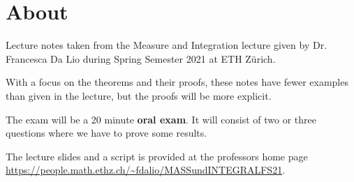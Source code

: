 \section*{About}

Lecture notes taken from the Measure and Integration lecture given by Dr. Francesca Da Lio during Spring Semester 2021 at ETH Zürich.

With a focus on the theorems and their proofs,
these notes have fewer examples than given in the lecture, but the proofs will be more explicit.

The exam will be a 20 minute \textbf{oral exam}. It will consist of two or three questions where we have to prove some results.

The lecture slides and a script is provided at the professors home page \url{https://people.math.ethz.ch/~fdalio/MASSundINTEGRALFS21}.


